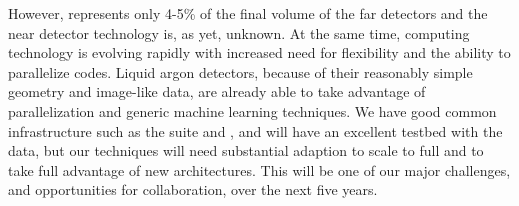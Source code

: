 However,  represents only 4-5\% of the final volume of the far detectors and the near detector technology is, as yet, unknown.  At the same time, computing technology is evolving rapidly with increased need for flexibility and the ability to parallelize codes.  Liquid argon detectors, because of their reasonably simple geometry and image-like data, are already able to take advantage of parallelization and generic machine learning techniques.  We have good common infrastructure such as the  suite and , and will have an excellent testbed with the  data,  but our techniques will need substantial adaption to scale to full  and to take full advantage of new architectures.  This will be one of our major challenges, and opportunities for collaboration,  over the next five years.

